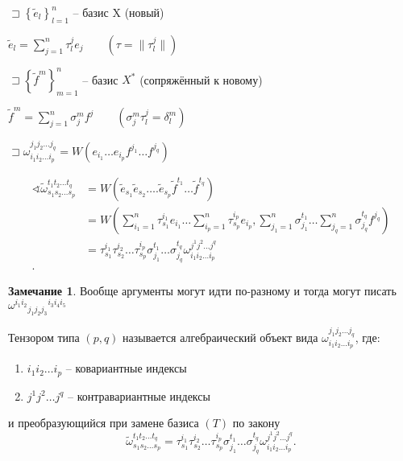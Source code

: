 \documentclass{book}
\newcommand{\tl}[1]{\widetilde{#1}}
\theoremstyle{definition}
\newtheorem*{note}{Замечание}
\begin{document}
$\sqsupset \left\{ \tl e_l \right\} _{l=1}^n$ -- базис X (новый)

$\tl e_l = \sum_{j=1}^{n} \tau_l^je_j\qquad \left( \tau = \|\tau_l^j\| \right) $

$\sqsupset \left\{ \tl f^m \right\} _{m=1}^n$ -- базис $X^*$ (сопряжённый к новому)

$\tl f^m = \sum_{j=1}^{n} \sigma_j^mf^j \qquad \left( \sigma_j^m\tau_l^j = \delta_l^m \right) $

$\sqsupset \omega_{i_1i_2\ldots i_p}^{j_1j_2 \ldots j_q} = W\left( e_{i_1} \ldots e_{i_p}f^{j_1}\ldots f^{j_q} \right) $

\begin{align*}    
    \sphericalangle \tl{\omega}^{t_1t_2 \ldots t_q}_{s_1 s_2 \ldots s_p} &= W\left( \tl e_{s_1}\tl e_{s_2}\ldots. \tl e_{s_p}\tl f^{t_1}\ldots \tl f^{t_q} \right)\\
                                                                         &= W\left( \sum_{i_1=1}^{n} \tau_{s_1}^{i_1}e_{i_1} \ldots \sum_{i_p=1}^{n} \tau_{s_p}^{i_p}e_{i_p}, \sum_{j_1=1}^{n} \sigma_{j_1}^{t_1} \ldots \sum_{j_q = 1}^{n} \sigma_{j_q}^{t_q}f^{j_q} \right)  \\
                                                                         &= \tau_{s_1}^{i_1}\tau_{s_2}^{i_2} \ldots \tau_{s_p}^{i_p}\sigma_{j_1}^{t_1} \ldots \sigma_{j_q}^{t_q} \omega_{i_1i_2 \ldots i_p}^{j^1j^2 \ldots j^q} \\
.\end{align*}

\begin{note}
    Вообще аргументы могут идти по-разному и тогда могут писать $\omega^{i_1i_2}{}_{j_1j_2j_3}{}^{i_3i_4i_5}$
\end{note}

\begin{definition}
    Тензором типа $(p,q)$  называется алгебраический объект вида  $\omega_{i_1i_2\ldots i_p}^{j_1j_2 \ldots j_q}$, где:
    \begin{enumerate}
        \item [] $i_1i_2 \ldots i_p$ -- ковариантные индексы
        \item [] $j^1 j^2 \ldots j^q$ -- контравариантные индексы
    \end{enumerate}
    и преобразующийся при замене базиса $(T)$ по закону
    \[
    \tl{\omega}^{t_1t_2 \ldots t_q}_{s_1 s_2 \ldots s_p} = \tau_{s_1}^{i_1}\tau_{s_2}^{i_2} \ldots \tau_{s_p}^{i_p}\sigma_{j_1}^{t_1} \ldots \sigma_{j_q}^{t_q} \omega_{i_1i_2 \ldots i_p}^{j^1j^2 \ldots j^q}
    .\] 
\end{definition}
\end{document}
